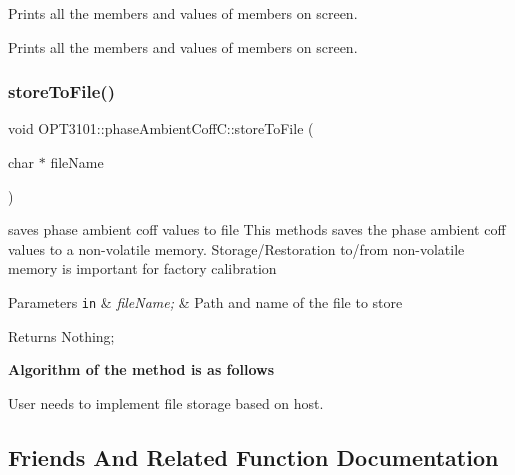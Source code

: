 \begin{DoxyItemize}
\item Prints all the members and values of members on screen. ~\newline

\item Prints all the members and values of members on screen. 
\end{DoxyItemize}\mbox{\label{class_o_p_t3101_1_1phase_ambient_coff_c_ad5b439c7ab384c03fa540d2bc06c3352}} 
\subsubsection{\texorpdfstring{store\+To\+File()}{storeToFile()}}
{\footnotesize\ttfamily void O\+P\+T3101\+::phase\+Ambient\+Coff\+C\+::store\+To\+File (\begin{DoxyParamCaption}\item[{char $\ast$}]{file\+Name }\end{DoxyParamCaption})}



saves phase ambient coff values to file This methods saves the phase ambient coff values to a non-\/volatile memory. Storage/\+Restoration to/from non-\/volatile memory is important for factory calibration 


\begin{DoxyParams}[1]{Parameters}
\mbox{\tt in}  & {\em file\+Name;} & Path and name of the file to store \\
\hline
\end{DoxyParams}
\begin{DoxyReturn}{Returns}
Nothing; 
\end{DoxyReturn}
{\bfseries Algorithm of the method is as follows}


\begin{DoxyItemize}
\item User needs to implement file storage based on host. 
\end{DoxyItemize}

\subsection{Friends And Related Function Documentation}
\mbox{\label{class_o_p_t3101_1_1phase_ambient_coff_c_a3febbb121799f99cb3f3f6578b43fae9}} 

